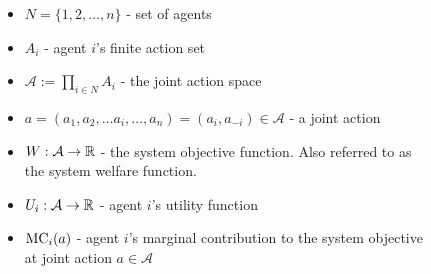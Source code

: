 \begin{figure}
\vspace{.15in}
\begin{mdframed}
\underline{}
\begin{itemize}
    \item $N = \{1,2,\ldots,n\}$ - set of agents
    \item $A_i$ - agent $i$'s finite action set
    \item $\mathcal{A}:=\prod_{i\in N} A_i$ - the joint action space
    \item $a = (a_1,a_2,\ldots a_i,\ldots,a_n) = (a_i,a_{-i})\in\mathcal{A}$ - a joint action
    \item $W:\mathcal{A}\to\mathbb{R}$ - the system objective function. Also referred to as the system welfare function.
    \item $U_i:\mathcal{A}\to\mathbb{R}$ - agent $i$'s utility function
    \item ${\rm MC}_i(a)$ - agent $i$'s marginal contribution to the system objective at joint action $a\in \mathcal{A}$
\end{itemize}
\end{mdframed}
\end{figure}



